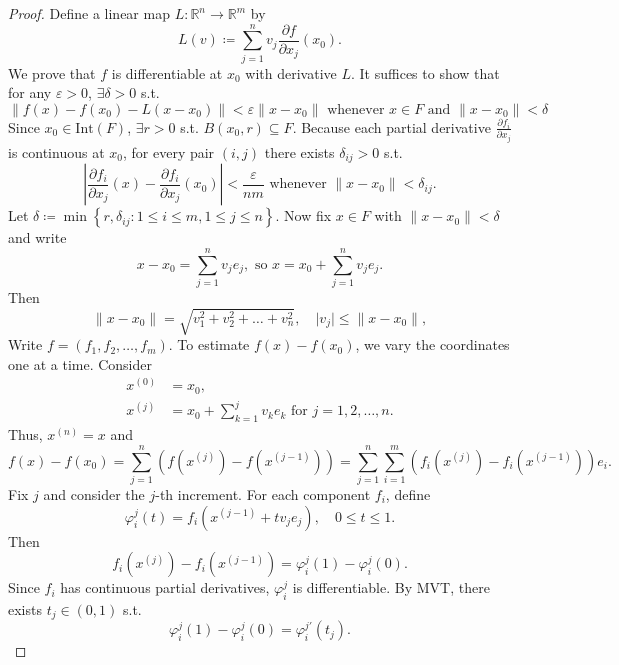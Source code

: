 \begin{proof}
    Define a linear map \(L: \mathbb{R} ^n \to \mathbb{R} ^m\) by 
    \[
        L(v) \coloneqq \sum_{j=1}^n v_j \frac{\partial f}{\partial x_j}(x_0). 
    \]
    We prove that \(f\) is differentiable at \(x_0\) with derivative \(L\). It suffices to show that for any \(\varepsilon > 0\), \(\exists \delta >0\) s.t. 
    \[
        \left\lVert f(x) - f(x_0) - L(x - x_0) \right\rVert < \varepsilon \lVert x - x_0 \rVert \text{ whenever } x \in F \text{ and } \lVert x - x_0 \rVert < \delta    
    \] 
    Since \(x_0 \in \mathrm{Int}(F) \), \(\exists r > 0\) s.t. \(B(x_0, r) \subseteq F\). Because each partial derivative \(\frac{\partial f_i}{\partial x_j} \) is continuous at \(x_0\), for every pair \((i, j)\) there exists \(\delta _{ij} > 0\) s.t. 
    \[
        \left\vert \frac{\partial f_i}{\partial x_j}(x) - \frac{\partial f_i}{\partial x_j}(x_0) \right\vert < \frac{\varepsilon}{nm} \text{ whenever } \lVert x - x_0 \rVert < \delta _{ij}.    
    \] 
    Let \(\delta \coloneqq \min \left\{ r, \delta _{ij} : 1 \le i \le m, 1 \le j \le n \right\} \). Now fix \(x \in F\) with \(\lVert x - x_0 \rVert < \delta \) and write 
    \[
        x - x_0 = \sum_{j=1}^n v_j e_j, \text{ so } x = x_0 + \sum_{j=1}^n v_j e_j.   
    \]            
    Then 
    \[
        \lVert x - x_0 \rVert = \sqrt{v_1^2 + v_2^2 + \dots + v_n^2}, \quad \vert v_j \vert \le \lVert x - x_0 \rVert,    
    \]
    Write \(f = (f_1, f_2, \dots , f_m)\). To estimate \(f(x) - f(x_0)\), we vary the coordinates one at a time. Consider 
    \begin{align*}
        x^{(0)} &= x_0, \\
        x^{(j)} &= x_0 + \sum_{k=1}^{j} v_k e_k \text{ for } j = 1,2,\dots ,n.     
    \end{align*} 
    Thus, \(x^{(n)} = x\) and 
    \[
        f(x) - f(x_0) = \sum_{j=1}^n \left( f \left( x^{(j)} \right) - f \left( x^{(j-1)} \right)   \right) = \sum_{j=1}^n \sum_{i=1}^m \left( f_i \left( x^{(j)} \right) - f_i \left( x^{(j-1)} \right)   \right)e_i.    
    \] 
    Fix \(j\) and consider the \(j\)-th increment. For each component \(f_i\), define 
    \[
        \varphi _i^j(t) = f_i \left( x^{(j-1)} + t v_j e_j \right), \quad 0 \le t \le 1. 
    \]   
    Then 
    \[
        f_i \left( x^{(j)} \right) - f_i \left( x^{(j-1)} \right) = \varphi _i^j(1) - \varphi _i^j(0).  
    \]
    Since \(f_i\) has continuous partial derivatives, \(\varphi _i^j\) is differentiable. By MVT, there exists \(t_j \in (0, 1)\) s.t. 
    \[
        \varphi _i^j(1) - \varphi _i^j(0) = \varphi _i^{j\prime} (t_j).
\]
\end{proof}
